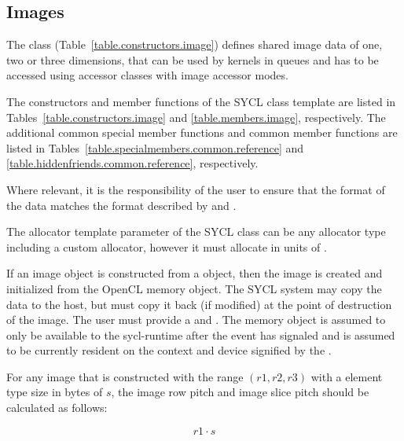 


\subsection{Images}
\label{subsec:images}

The class 
(Table~\ref{table.constructors.image}) defines shared image data of one,
two or three dimensions, that can be used by kernels in queues and has to
be accessed using \gls{accessor} classes with image accessor modes.

The constructors and member functions of the SYCL  class template are listed in Tables~\ref{table.constructors.image} and \ref{table.members.image}, respectively. The additional common special member functions and common member functions are listed in Tables~\ref{table.specialmembers.common.reference} and \ref{table.hiddenfriends.common.reference}, respectively.

Where relevant, it is the
responsibility of the user to ensure that the format of the data
matches the format described by
 and .

The allocator template parameter of the SYCL  class can be any allocator type including a custom allocator, however it must allocate in units of .

If an image object is constructed from a  object,
then the image is created and initialized from the OpenCL memory
object. The SYCL system may copy the data to the host, but must copy
it back (if modified) at the point of destruction of the image.
The user must provide a  and
. The memory object is assumed to only be available to the
\gls{sycl-runtime} after the event has signaled and is assumed to be
currently resident on the context and device signified by the
.

For any image that is constructed with the range $(r1, r2, r3)$ with a element
type size in bytes of $s$, the image row pitch and image slice pitch should be
calculated as follows:

\begin{equation}
\label{image-row-pitch}
 r1 \cdot s
\end{equation}

